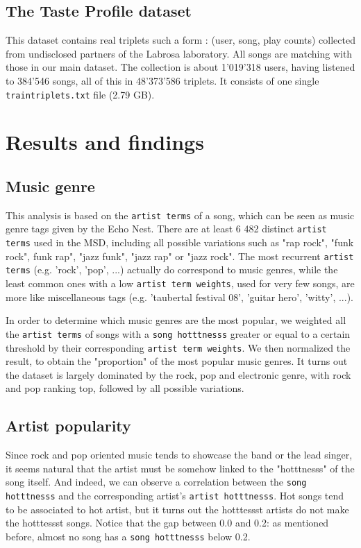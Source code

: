 \documentclass[10pt]{article}
\renewcommand\_{\textunderscore\allowbreak}
\begin{document}
\subsection{The Taste Profile dataset}
This dataset contains real triplets such a form : (user, song, play counts) collected from undisclosed partners of the Labrosa laboratory. All songs are  matching with those in our main dataset. The collection is about 1'019'318 users, having listened to 384'546 songs, all of this in 48'373'586 triplets. It consists of one single \texttt{train\_triplets.txt} file (2.79 GB).
\section{Results and findings}

\subsection{Music genre}
This analysis is based on the \texttt{artist terms} of a song, which can be seen as music genre tags given by the Echo Nest.
There are at least 6 482 distinct \texttt{artist terms} used in the MSD, including all possible variations such as "rap rock", "funk rock", funk rap", "jazz funk", "jazz rap" or "jazz rock".
The most recurrent \texttt{artist terms} (e.g. 'rock', 'pop', ...) actually do correspond to music genres, while the least common ones with a low \texttt{artist term weights}, used for very few songs, are more like miscellaneous tags (e.g. 'taubertal festival 08', 'guitar hero', 'witty', ...).

In order to determine which music genres are the most popular, we weighted all the \texttt{artist terms} of songs with a \texttt{song hotttnesss} greater or equal to a certain threshold by their corresponding \texttt{artist term weights}. 
We then normalized the result, to obtain the "proportion" of the most popular music genres.
It turns out the dataset is largely dominated by the rock, pop and electronic genre, with rock and pop ranking top, followed by all possible variations.

\subsection{Artist popularity}
Since rock and pop oriented music tends to showcase the band or the lead singer, it seems natural that the artist must be somehow linked to the "hotttnesss" of the song itself.
And indeed, we can observe a correlation between the \texttt{song hotttnesss} and the corresponding artist's \texttt{artist hotttnesss}.
Hot songs tend to be associated to hot artist, but it turns out the hotttessst artists do not make the hotttessst songs.
Notice that the gap between 0.0 and 0.2: as mentioned before, almost no song has a \texttt{song hotttnesss} below 0.2.
\end{document}
